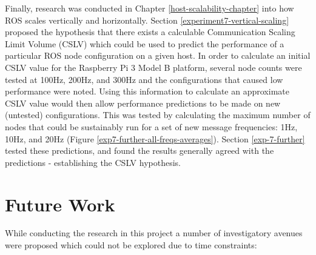 \documentclass[../dissertation.tex]{subfiles}
\begin{document}
Finally, research was conducted in Chapter \ref{host-scalability-chapter} into how ROS scales vertically and horizontally. Section \ref{experiment7-vertical-scaling} proposed the hypothesis that there exists a calculable Communication Scaling Limit Volume (CSLV) which could be used to predict the performance of a particular ROS node configuration on a given host. In order to calculate an initial CSLV value for the Raspberry Pi 3 Model B platform, several node counts were tested at 100Hz, 200Hz, and 300Hz and the configurations that caused low performance were noted. Using this information to calculate an approximate CSLV value would then allow performance predictions to be made on new (untested) configurations. This was tested by calculating the maximum number of nodes that could be sustainably run for a set of new message frequencies: 1Hz, 10Hz, and 20Hz (Figure \ref{exp7-further-all-freqs-averages}). Section \ref{exp-7-further} tested these predictions, and found the results generally agreed with the predictions - establishing the CSLV hypothesis.




\section{Future Work} %

While conducting the research in this project a number of investigatory avenues were proposed which could not be explored due to time constraints:
\end{document}
